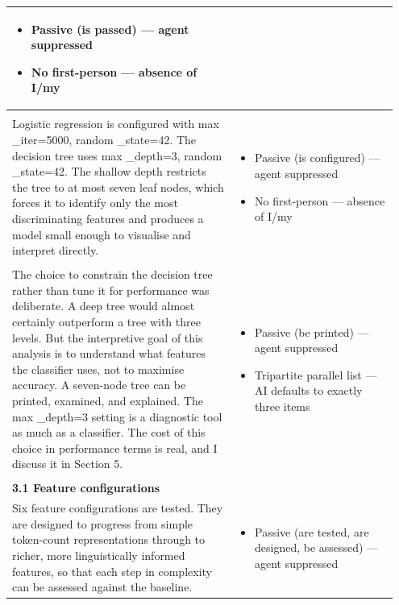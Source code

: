 \documentclass[11pt]{article}
\begin{document}
\begin{longtable}{|p{0.55\linewidth}|p{0.40\linewidth}|}
\begin{itemize}[leftmargin=1em,itemsep=1pt,topsep=1pt,parsep=0pt]
  \item Passive (is passed) --- agent suppressed
  \item No first-person --- absence of I/my
\end{itemize} \\[2pt]
\hline
\rule{0pt}{3.5cm} & \\
\hline
Logistic regression is configured with max \_iter=5000, random \_state=42. The decision tree uses max \_depth=3, random \_state=42. The shallow depth restricts the tree to at most seven leaf nodes, which forces it to identify only the most discriminating features and produces a model small enough to visualise and interpret directly. & \begin{itemize}[leftmargin=1em,itemsep=1pt,topsep=1pt,parsep=0pt]
  \item Passive (is configured) --- agent suppressed
  \item No first-person --- absence of I/my
\end{itemize} \\[2pt]
\hline
\rule{0pt}{3.5cm} & \\
\hline
The choice to constrain the decision tree rather than tune it for performance was deliberate. A deep tree would almost certainly outperform a tree with three levels. But the interpretive goal of this analysis is to understand what features the classifier uses, not to maximise accuracy. A seven-node tree can be printed, examined, and explained. The max \_depth=3 setting is a diagnostic tool as much as a classifier. The cost of this choice in performance terms is real, and I discuss it in Section 5. & \begin{itemize}[leftmargin=1em,itemsep=1pt,topsep=1pt,parsep=0pt]
  \item Passive (be printed) --- agent suppressed
  \item Tripartite parallel list --- AI defaults to exactly three items
\end{itemize} \\[2pt]
\hline
\rule{0pt}{3.5cm} & \\
\hline
\textbf{3.1 Feature configurations}\\[4pt]
Six feature configurations are tested. They are designed to progress from simple token-count representations through to richer, more linguistically informed features, so that each step in complexity can be assessed against the baseline. & \begin{itemize}[leftmargin=1em,itemsep=1pt,topsep=1pt,parsep=0pt]
  \item Passive (are tested, are designed, be assessed) --- agent suppressed

\end{itemize}
\end{longtable}
\end{document}
